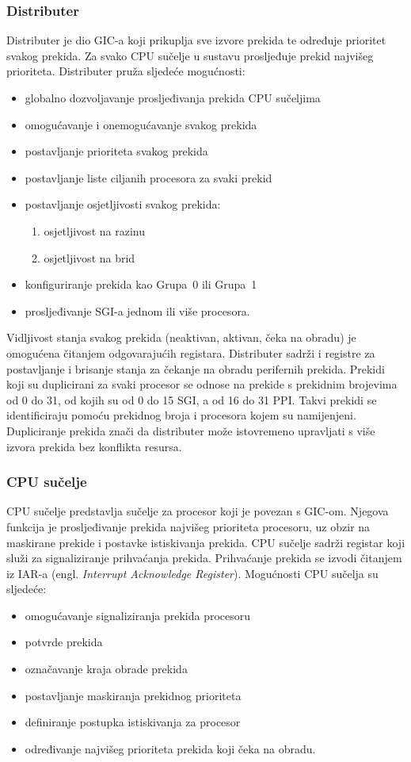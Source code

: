 \documentclass[times, utf8, diplomski, numeric]{fer}
\begin{document}
\subsubsection{Distributer}
Distributer je dio GIC-a koji prikuplja sve izvore prekida te određuje prioritet svakog prekida. Za svako CPU sučelje u
sustavu prosljeđuje prekid najvišeg prioriteta. Distributer pruža sljedeće mogućnosti:
\begin{itemize}
  \item{globalno dozvoljavanje prosljeđivanja prekida CPU sučeljima}
  \item{omogućavanje i onemogućavanje svakog prekida}
  \item{postavljanje prioriteta svakog prekida}
  \item{postavljanje liste ciljanih procesora za svaki prekid}
  \item{postavljanje osjetljivosti svakog prekida:}
  \begin{enumerate}
    \item{osjetljivost na razinu}
    \item{osjetljivost na brid}
  \end{enumerate}
  \item{konfiguriranje prekida kao Grupa~0 ili Grupa~1}
  \item{prosljeđivanje SGI-a jednom ili više procesora.}
\end{itemize}
Vidljivost stanja svakog prekida (neaktivan, aktivan, čeka na obradu) je omogućena čitanjem odgovarajućih registara.
Distributer sadrži i registre za postavljanje i brisanje stanja za čekanje na obradu perifernih prekida. Prekidi koji
su duplicirani za svaki procesor se odnose na prekide s prekidnim brojevima od 0 do 31, od kojih su od 0 do 15 SGI, a
od 16 do 31 PPI. Takvi prekidi se identificiraju pomoću prekidnog broja i procesora kojem su namijenjeni. Dupliciranje
prekida znači da distributer može istovremeno upravljati s više izvora prekida bez konflikta resursa.

\subsubsection{CPU sučelje}
CPU sučelje predstavlja sučelje za procesor koji je povezan s GIC-om. Njegova funkcija je prosljeđivanje prekida najvišeg
prioriteta procesoru, uz obzir na maskirane prekide i postavke istiskivanja prekida. CPU sučelje sadrži registar koji
služi za signaliziranje prihvaćanja prekida. Prihvaćanje prekida se izvodi čitanjem iz IAR-a (engl. \textit{Interrupt
Acknowledge Register}). Mogućnosti CPU sučelja su sljedeće:
\begin{itemize}
  \item{omogućavanje signaliziranja prekida procesoru}
  \item{potvrde prekida}
  \item{označavanje kraja obrade prekida}
  \item{postavljanje maskiranja prekidnog prioriteta}
  \item{definiranje postupka istiskivanja za procesor}
  \item{određivanje najvišeg prioriteta prekida koji čeka na obradu.}
\end{itemize}
\end{document}
